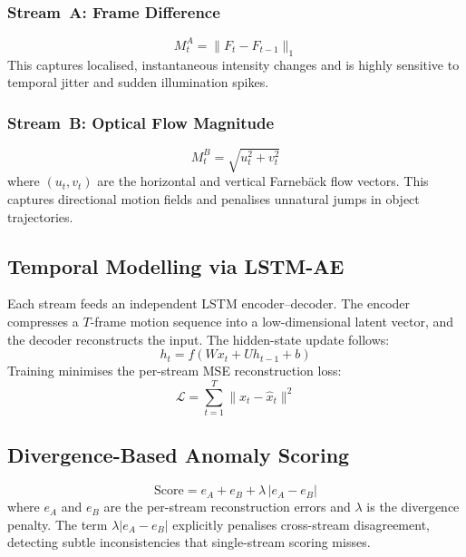\documentclass[conference]{IEEEtran}
\begin{document}
\subsubsection{Stream~A: Frame Difference}
\begin{equation}
M^A_t = \|F_t - F_{t-1}\|_1
\label{eq:fd}
\end{equation}
This captures localised, instantaneous intensity changes and is highly
sensitive to temporal jitter and sudden illumination spikes.

\subsubsection{Stream~B: Optical Flow Magnitude}
\begin{equation}
M^B_t = \sqrt{u_t^2 + v_t^2}
\label{eq:of}
\end{equation}
where $(u_t, v_t)$ are the horizontal and vertical Farnebäck flow vectors.
This captures directional motion fields and penalises unnatural jumps in
object trajectories.

\subsection{Temporal Modelling via LSTM-AE}
Each stream feeds an independent LSTM encoder--decoder.  The encoder
compresses a $T$-frame motion sequence into a low-dimensional latent
vector, and the decoder reconstructs the input.  The hidden-state update
follows:
\begin{equation}
h_t = f(Wx_t + Uh_{t-1} + b)
\label{eq:lstm}
\end{equation}
Training minimises the per-stream MSE reconstruction loss:
\begin{equation}
\mathcal{L} = \sum_{t=1}^{T}\|x_t - \hat{x}_t\|^2
\label{eq:loss}
\end{equation}

\subsection{Divergence-Based Anomaly Scoring}
\begin{equation}
\mathrm{Score} = e_A + e_B + \lambda\,|e_A - e_B|
\label{eq:score}
\end{equation}
where $e_A$ and $e_B$ are the per-stream reconstruction errors and
$\lambda$ is the divergence penalty.  The term $\lambda|e_A - e_B|$
explicitly penalises cross-stream disagreement, detecting subtle
inconsistencies that single-stream scoring misses.
\end{document}
